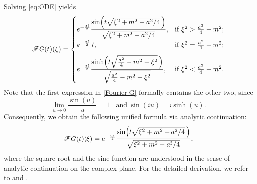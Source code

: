 \documentclass[11pt,reqno]{amsart}
\numberwithin{equation}{section}
\newcommand{\1}{{\bf 1}}
\newcommand{\2}{{\bf 2}}
\begin{document}
Solving   \eqref{eq:ODE}  yields 
  \begin{equation}\label{Fourier G}
    \mathscr F{G}(t)(\xi)= 
\begin{cases}
\displaystyle
e^{-\frac{at}{2}}\frac{ \sin \Bigl(t\sqrt{\xi^2+m^2-a^2/4}\,\Bigr)}
     {\sqrt{\xi^2+m^2-a^2/4}}, 
& \text{if } \xi^2 > \frac{a^2}{4} - m^2;\\[8pt]
\displaystyle
e^{-\frac{at}{2}}\, t,  
& \text{if } \xi^2 = \frac{a^2}{4} - m^2;\\[8pt]
\displaystyle
e^{-\frac{at}{2}} \frac{ \sinh \Bigl(t\sqrt{\frac{a^2}{4}-m^2-\xi^2}\,\Bigr)}
     {\sqrt{\frac{a^2}{4}-m^2-\xi^2}},  
& \text{if } \xi^2 < \frac{a^2}{4} - m^2.
\end{cases}
\end{equation}
Note that the first   expression in \eqref{Fourier G} formally contains the other two, since  
$$
\lim_{u\rightarrow0}\frac{\sin(u)}{u}=1\ \ \ \ \text{and } \sin(iu)=i \sinh(u). 
$$
Consequently, we obtain the following unified formula via analytic continuation:
 \begin{equation}\label{eq unif}
  \mathscr F{G}(t)(\xi)= e^{-\frac{at}{2}}\frac{ \sin \Bigl(t\sqrt{\xi^2+m^2-a^2/4}\,\Bigr)}
     {\sqrt{\xi^2+m^2-a^2/4}},
\end{equation}
where the square root and the sine function are understood in the sense of analytic continuation on the complex plane.   For the detailed derivation, we refer to \cite[Example 7]{D99} and \cite[pp. 50--51]{DKMNX09}.  
\end{document}
